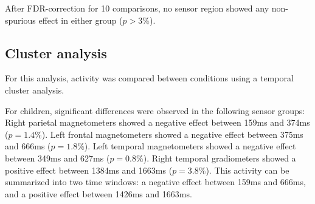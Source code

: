 After FDR-correction for 10 comparisons, no sensor region showed any non-spurious effect in either group ($p > 3\%$).

\subsection{Cluster analysis}
For this analysis, activity was compared between conditions using a temporal cluster analysis.

For children, significant differences were observed in the following sensor groups:
Right parietal magnetometers showed a negative effect between 159ms and 374ms ($p = 1.4\%$).
Left frontal magnetometers showed a negative effect between 375ms and 666ms ($p = 1.8\%$).
Left temporal magnetometers showed a negative effect between 349ms and 627ms ($p = 0.8\%$).
Right temporal gradiometers showed a positive effect between 1384ms and 1663ms ($p = 3.8\%$).
This activity can be summarized into two time windows: a negative effect between 159ms and 666ms, and a positive effect between 1426ms and 1663ms.

